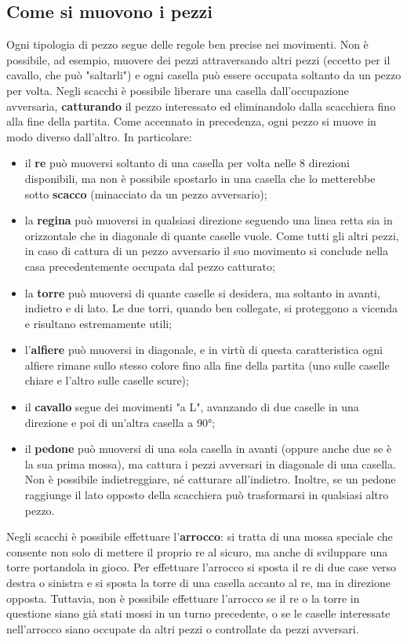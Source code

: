 \subsection{Come si muovono i pezzi}
Ogni tipologia di pezzo segue delle regole ben precise nei movimenti. Non è possibile, ad esempio, muovere dei pezzi attraversando altri pezzi (eccetto per il cavallo, che può "saltarli") e ogni casella può essere occupata soltanto da un pezzo per volta. Negli scacchi è possibile liberare una casella dall'occupazione avversaria, \textbf{catturando} il pezzo interessato ed eliminandolo dalla scacchiera fino alla fine della partita. Come accennato in precedenza, ogni pezzo si muove in modo diverso dall'altro. In particolare:
\begin{itemize}
    \item il \textbf{re} può muoversi soltanto di una casella per volta nelle 8 direzioni disponibili, ma non è possibile spostarlo in una casella che lo metterebbe sotto \textbf{scacco} (minacciato da un pezzo avversario);
    \item la \textbf{regina} può muoversi in qualsiasi direzione seguendo una linea retta sia in orizzontale che in diagonale di quante caselle vuole. Come tutti gli altri pezzi, in caso di cattura di un pezzo avversario il suo movimento si conclude nella casa precedentemente occupata dal pezzo catturato;
    \item la \textbf{torre} può muoversi di quante caselle si desidera, ma soltanto in avanti, indietro e di lato. Le due torri, quando ben collegate, si proteggono a vicenda e risultano estremamente utili;
    \item l'\textbf{alfiere} può muoversi in diagonale, e in virtù di questa caratteristica ogni alfiere rimane sullo stesso colore fino alla fine della partita (uno sulle caselle chiare e l'altro sulle caselle scure);
    \item il \textbf{cavallo} segue dei movimenti "a L", avanzando di due caselle in una direzione e poi di un'altra casella a 90°;
    \item il \textbf{pedone} può muoversi di una sola casella in avanti (oppure anche due se è la sua prima mossa), ma cattura i pezzi avversari in diagonale di una casella. Non è possibile indietreggiare, né catturare all'indietro. Inoltre, se un pedone raggiunge il lato opposto della scacchiera può trasformarsi in qualsiasi altro pezzo.
\end{itemize}
Negli scacchi è possibile effettuare l'\textbf{arrocco}: si tratta di una mossa speciale che consente non solo di mettere il proprio re al sicuro, ma anche di sviluppare una torre portandola in gioco. Per effettuare l'arrocco si sposta il re di due case verso destra o sinistra e si sposta la torre di una casella accanto al re, ma in direzione opposta. Tuttavia, non è possibile effettuare l'arrocco se il re o la torre in questione siano già stati mossi in un turno precedente, o se le caselle interessate nell'arrocco siano occupate da altri pezzi o controllate da pezzi avversari. 
